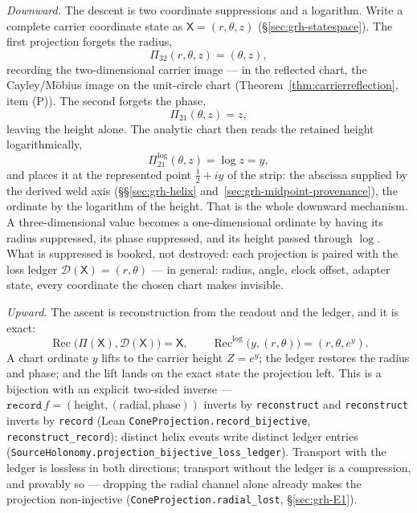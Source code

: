 \emph{Downward.} The descent is two coordinate suppressions and a logarithm.
Write a complete carrier coordinate state as \(\mathsf X=(r,\theta,z)\)
(\S\ref{sec:grh-statespace}). The first projection forgets the radius,
\[
\Pi_{32}(r,\theta,z)=(\theta,z),
\]
recording the two-dimensional carrier image --- in the reflected chart, the
Cayley/M\"obius image on the unit-circle chart
(Theorem~\ref{thm:carrierreflection}, item (P)). The second forgets the
phase,
\[
\Pi_{21}(\theta,z)=z,
\]
leaving the height alone. The analytic chart then reads the retained height
logarithmically,
\[
\Pi^{\log}_{21}(\theta,z)=\log z=y,
\]
and places it at the represented point \(\tfrac12+iy\) of the strip: the
abscissa supplied by the derived weld axis
(\S\S\ref{sec:grh-helix} and~\ref{sec:grh-midpoint-provenance}), the
ordinate by the logarithm of the height. That is
the whole downward mechanism. A three-dimensional value becomes a
one-dimensional ordinate by having its radius suppressed, its phase
suppressed, and its height passed through \(\log\). What is suppressed is
booked, not destroyed: each projection is paired with the loss ledger
\(\mathcal D(\mathsf X)=(r,\theta)\) --- in general: radius, angle, clock
offset, adapter state, every coordinate the chosen chart makes invisible.

\emph{Upward.} The ascent is reconstruction from the readout and the ledger,
and it is exact:
\[
\operatorname{Rec}\bigl(\Pi(\mathsf X),\mathcal D(\mathsf X)\bigr)=\mathsf X,
\qquad
\operatorname{Rec}^{\log}\bigl(y,(r,\theta)\bigr)=(r,\theta,e^{y}).
\]
A chart ordinate \(y\) lifts to the carrier height \(Z=e^{y}\); the ledger
restores the radius and phase; and the lift lands on the exact state the
projection left. This is a bijection with an explicit two-sided inverse ---
\(\texttt{record}\,f=(\text{height},(\text{radial},\text{phase}))\) inverts
by \texttt{reconstruct} and \texttt{reconstruct} inverts by \texttt{record}
(Lean \texttt{ConeProjection.record\_bijective}, \texttt{reconstruct\_record});
distinct helix events write distinct ledger entries
(\texttt{SourceHolonomy.projection\_bijective\_loss\_ledger}). Transport with
the ledger is lossless in both directions; transport without the ledger is a
compression, and provably so --- dropping the radial channel alone already
makes the projection non-injective (\texttt{ConeProjection.radial\_lost},
\S\ref{sec:grh-E1}).

